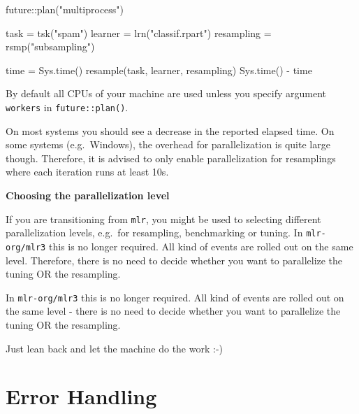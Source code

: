 \documentclass[
  11pt,
  parskip=half,
  DIV=calc,
  BCOR=10mm,
  x11names]{scrbook}
\makeatletter
\newenvironment{Shaded}{}{}
\newcommand{\KeywordTok}[1]{\textcolor[rgb]{0.00,0.00,1.00}{#1}}
\newcommand{\NormalTok}[1]{#1}
\newcommand{\OperatorTok}[1]{#1}
\newcommand{\StringTok}[1]{\textcolor[rgb]{0.00,0.50,0.50}{#1}}
\newenvironment{kframe}{%
\medskip{}
\setlength{\fboxsep}{.8em}
 \def\at@end@of@kframe{}%
 \ifinner\ifhmode%
  \def\at@end@of@kframe{\end{minipage}}%
  \begin{minipage}{\columnwidth}%
 \fi\fi%
 \def\FrameCommand##1{\hskip\@totalleftmargin \hskip-\fboxsep
 \colorbox{shadecolor}{##1}\hskip-\fboxsep
     \hskip-\linewidth \hskip-\@totalleftmargin \hskip\columnwidth}%
 \MakeFramed {\advance\hsize-\width
   \@totalleftmargin\z@ \linewidth\hsize
   \@setminipage}}%
 {\par\unskip\endMakeFramed%
 \at@end@of@kframe}
\newenvironment{rmdblock}[1]
  {
  \begin{itemize}
  \renewcommand{\labelitemi}{
    \raisebox{-.7\height}[0pt][0pt]{
      {\setkeys{Gin}{width=3em,keepaspectratio}\texttt{[image: images/\#1]}}
    }
  }
  \setlength{\fboxsep}{1em}
  \begin{kframe}
  \item
  }
  {
  \end{kframe}
  \end{itemize}
  }
\newenvironment{caution}
  {\begin{rmdblock}{caution}}
  {\end{rmdblock}}
\makeatother
\begin{document}
\begin{Shaded}
\begin{Highlighting}[]
\NormalTok{future}\OperatorTok{::}\KeywordTok{plan}\NormalTok{(}\StringTok{"multiprocess"}\NormalTok{)}

\NormalTok{task =}\StringTok{ }\KeywordTok{tsk}\NormalTok{(}\StringTok{"spam"}\NormalTok{)}
\NormalTok{learner =}\StringTok{ }\KeywordTok{lrn}\NormalTok{(}\StringTok{"classif.rpart"}\NormalTok{)}
\NormalTok{resampling =}\StringTok{ }\KeywordTok{rsmp}\NormalTok{(}\StringTok{"subsampling"}\NormalTok{)}

\NormalTok{time =}\StringTok{ }\KeywordTok{Sys.time}\NormalTok{()}
\KeywordTok{resample}\NormalTok{(task, learner, resampling)}
\KeywordTok{Sys.time}\NormalTok{() }\OperatorTok{-}\StringTok{ }\NormalTok{time}
\end{Highlighting}
\end{Shaded}

\begin{caution}
By default all CPUs of your machine are used unless you specify argument
\texttt{workers} in \texttt{future::plan()}.
\end{caution}

On most systems you should see a decrease in the reported elapsed time.
On some systems (e.g.~Windows), the overhead for parallelization is quite large though.
Therefore, it is advised to only enable parallelization for resamplings where each iteration runs at least 10s.

\textbf{Choosing the parallelization level}

If you are transitioning from \texttt{mlr}, you might be used to selecting different parallelization levels, e.g.~for resampling, benchmarking or tuning.
In \texttt{mlr-org/mlr3} this is no longer required.
All kind of events are rolled out on the same level.
Therefore, there is no need to decide whether you want to parallelize the tuning OR the resampling.

In \texttt{mlr-org/mlr3} this is no longer required.
All kind of events are rolled out on the same level - there is no need to decide whether you want to parallelize the tuning OR the resampling.

Just lean back and let the machine do the work :-)

\hypertarget{error-handling}{%
\section{Error Handling}\label{error-handling}}
\end{document}
